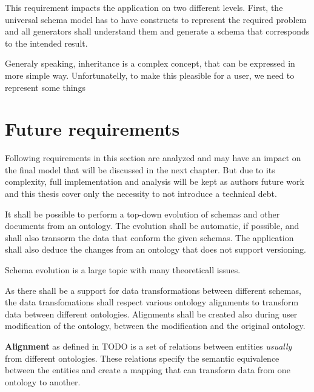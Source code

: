 This requirement impacts the application on two different levels. First, the universal schema model has to have constructs to represent the required problem and all generators shall understand them and generate a schema that corresponds to the intended result.

Generaly speaking, inheritance is a complex concept, that can be expressed in more simple way. Unfortunatelly, to make this pleasible for a user, we need to represent some things %


\section{Future requirements}

Following requirements in this section are analyzed and may have an impact on the final model that will be discussed in the next chapter. But due to its complexity, full implementation and analysis will be kept as authors future work and this thesis cover only the necessity to not introduce a technical debt.

\begin{requirement}
    It shall be possible to perform a top-down evolution of schemas and other documents from an ontology. The evolution shall be automatic, if possible, and shall also transorm the data that conform the given schemas. The application shall also deduce the changes from an ontology that does not support versioning.
\end{requirement}

Schema evolution is a large topic with many theoreticall issues.




\begin{requirement}
    As there shall be a support for data transformations between different schemas, the data transfomations shall respect various ontology alignments to transform data between different ontologies. Alignments shall be created also during user modification of the ontology, between the modification and the original ontology.
\end{requirement}

\textbf{Alignment} as defined in TODO is a set of relations between entities \textit{usually} from different ontologies. These relations specify the semantic equivalence between the entities and create a mapping that can transform data from one ontology to another.

